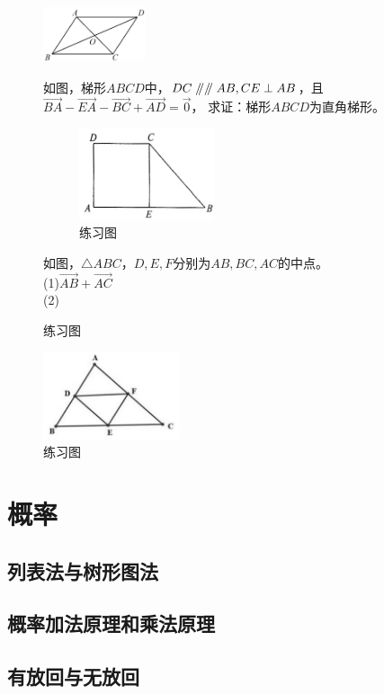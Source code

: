 \documentclass{ecnuthesis}
\newcommand\px{\mathrel{/\mkern-5mu/}}  %
\begin{document}
\begin{figure}[H]
\centering
\includegraphics[width=3cm]{picture/6113.png}
\caption{平行四边形与向量}
\begin{problem}
    如图，梯形$ABCD$中，$DC\px \px AB,CE\perp AB$，且$\overrightarrow{BA}-\overrightarrow{EA}-\overrightarrow{BC}+\overrightarrow{AD}=\vec{0}$，
    求证：梯形$ABCD$为直角梯形。
\end{problem}
\begin{figure}[H]
\centering
\includegraphics[width=4cm]{picture/6114.png}
\caption{练习图}
\end{figure}
\begin{problem}
     如图，$\triangle ABC$，$D,E,F$分别为$AB,BC,AC$的中点。\\
     (1)$\overrightarrow{AB}+\overrightarrow{AC}$ \\
     (2)
\end{problem}
\end{figure}
\begin{figure}[H]
\centering
\includegraphics[width=4cm]{picture/693.png}
\caption{练习图}
\end{figure}
\clearpage
\chapter{概率}
\section{列表法与树形图法}
\clearpage
\section{概率加法原理和乘法原理}
\clearpage
\section{有放回与无放回}
\clearpage
\end{document}
